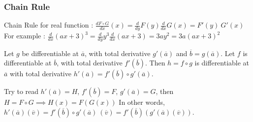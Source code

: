 \subsubsection{Chain Rule}
\begin{commentary}
	Chain Rule for real function : $\frac{d F \circ G}{dx}(x) = \frac{d}{dy}F(y) \frac{d}{dx}G(x) = F'(y)\ G'(x)$\\
	For example : $\frac{d}{dx} (ax+3)^3 = \frac{d}{dy}y^3 \frac{d}{dx} \left(ax+3\right) = 3ay^2 = 3a(ax+3)^2$
\end{commentary}
\begin{theorem}
	Let $g$ be differentiable at $\overline{a}$, with total derivative $g'(\overline{a})$ and $\overline{b} = g(\overline{a})$. Let $f$ is differentiable at $\overline{b}$, with total derivative $f'(\overline{b})$. Then $h = f \circ g$ is differentiable at $\overline{a}$ with total derivative $h'(\overline{a}) = f'(\overline{b}) \circ g'(\overline{a})$.
\begin{commentary}
	Try to read $h'(\overline{a}) = H$, $f'(\overline{b}) = F$, $g'(\overline{a}) = G$, then $H = F \circ G \implies H(x) = F(G(x))$
	In other words, $h'(\overline{a})(\overline{v}) = f'(\overline{b}) \circ g'(\overline{a})\ (\overline{v}) = f'(\overline{b})(g'(\overline{a})(\overline{v}))$.
\end{commentary}
\end{theorem}
